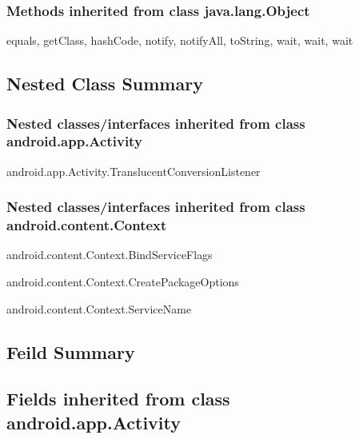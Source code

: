 \subsubsection{Methods inherited from class java.lang.Object}
equals, getClass, hashCode, notify, notifyAll, toString, wait, wait, wait\\






\subsection{Nested Class Summary}

\subsubsection{Nested classes/interfaces inherited from class android.app.Activity}
\begin{DoxyCompactItemize}
\item android.app.Activity.TranslucentConversionListener
\end{DoxyCompactItemize} 

\subsubsection{Nested classes/interfaces inherited from class android.content.Context}
\begin{DoxyCompactItemize}
\item android.content.Context.BindServiceFlags
\item android.content.Context.CreatePackageOptions
\item android.content.Context.ServiceName
\end{DoxyCompactItemize} 

\subsection{Feild Summary}

\subsection{Fields inherited from class android.app.Activity}


